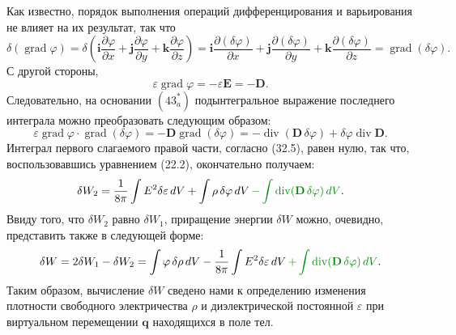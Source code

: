 \documentclass[a4paper,10pt]{article}
\newcommand{\redtext}[1]{\textcolor{redcolor}{#1}}
\newcommand{\modmath}[1]{\textcolor{modcolor}{#1}}
\begin{document}
Как известно, порядок выполнения операций дифференцирования и
варьирования не влияет на их результат, так что
$$
    \delta(\operatorname{grad}\varphi)
    = \delta\!\left(\mathbf{i}\frac{\partial\varphi}{\partial x}
                  + \mathbf{j}\frac{\partial\varphi}{\partial y}
                  + \mathbf{k}\frac{\partial\varphi}{\partial z}\right)
    = \mathbf{i}\frac{\partial(\delta\varphi)}{\partial x}
    + \mathbf{j}\frac{\partial(\delta\varphi)}{\partial y}
    + \mathbf{k}\frac{\partial(\delta\varphi)}{\partial z}
    = \operatorname{grad}(\delta\varphi).
$$
С другой стороны,
$$
    \varepsilon\operatorname{grad}\varphi = -\varepsilon\mathbf{E} = -\mathbf{D}.
$$
Следовательно, на основании $(43^*_a)$ подынтегральное выражение
последнего интеграла можно преобразовать следующим образом:
$$
    \varepsilon\operatorname{grad}\varphi\cdot\operatorname{grad}(\delta\varphi)
    = -\mathbf{D}\operatorname{grad}(\delta\varphi)
    = -\operatorname{div}(\mathbf{D}\,\delta\varphi)
    + \delta\varphi\operatorname{div}\mathbf{D}.
$$
\redtext{Интеграл первого слагаемого правой части, согласно (32.5), равен нулю},
так что, воспользовавшись уравнением (22.2), окончательно получаем:
$$
    \delta W_2 = \frac{1}{8\pi}\int E^2\delta\varepsilon\,dV
               + \int \rho\,\delta\varphi\,dV  \,\modmath{-\int \operatorname{div}(\mathbf{D}\,\delta\varphi)\,dV}.
$$
Ввиду того, что $\delta W_2$ равно $\delta W_1$, приращение энергии
$\delta W$ можно, очевидно, представить также в следующей форме:
$$
    \delta W = 2\delta W_1 - \delta W_2
    = \int \varphi\,\delta\rho\,dV
    - \frac{1}{8\pi}\int E^2\delta\varepsilon\,dV \,\modmath{+\int \operatorname{div}(\mathbf{D}\,\delta\varphi)\,dV}.
$$
Таким образом, вычисление $\delta W$ сведено нами к определению изменения
плотности свободного электричества $\rho$ и диэлектрической постоянной
$\varepsilon$ при виртуальном перемещении $\mathbf{q}$ находящихся
в поле тел.
\end{document}
